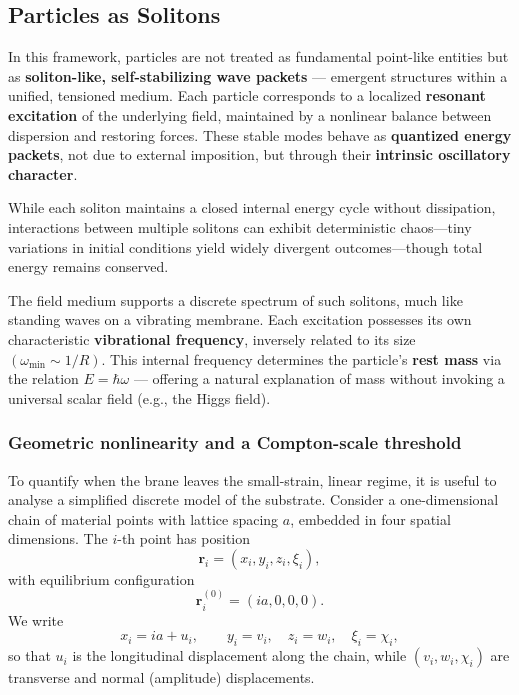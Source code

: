 \subsection{Particles as Solitons}\label{particles-as-solitons}

In this framework, particles are not treated as fundamental point-like
entities but as \textbf{soliton-like, self-stabilizing wave packets} ---
emergent structures within a unified, tensioned medium. Each particle
corresponds to a localized \textbf{resonant excitation} of the
underlying field, maintained by a nonlinear balance between dispersion
and restoring forces. These stable modes behave as \textbf{quantized
energy packets}, not due to external imposition, but through their
\textbf{intrinsic oscillatory character}.

While each soliton maintains a closed internal energy cycle without
dissipation, interactions between multiple solitons can exhibit
deterministic chaos---tiny variations in initial conditions yield widely
divergent outcomes---though total energy remains conserved.

The field medium supports a discrete spectrum of such solitons, much
like standing waves on a vibrating membrane. Each excitation possesses
its own characteristic \textbf{vibrational frequency}, inversely related
to its size $(\omega_\text{min} \sim 1/R)$. This internal frequency
determines the particle's \textbf{rest mass} via the relation
$E = \hbar \omega$ --- offering a natural explanation of mass without
invoking a universal scalar field (e.g., the Higgs field).

\subsubsection{Geometric nonlinearity and a Compton-scale threshold}
\label{threshold-localization}

To quantify when the brane leaves the small-strain, linear regime, it is
useful to analyse a simplified discrete model of the substrate. Consider
a one-dimensional chain of material points with lattice spacing $a$,
embedded in four spatial dimensions. The $i$-th point has position
\[
  \mathbf r_i = (x_i, y_i, z_i, \xi_i),
\]
with equilibrium configuration
\[
  \mathbf r_i^{(0)} = (ia,0,0,0).
\]
We write
\[
  x_i = ia + u_i, \qquad
  y_i = v_i,\quad
  z_i = w_i,\quad
  \xi_i = \chi_i,
\]
so that $u_i$ is the longitudinal displacement along the chain, while
$(v_i,w_i,\chi_i)$ are transverse and normal (amplitude) displacements.

